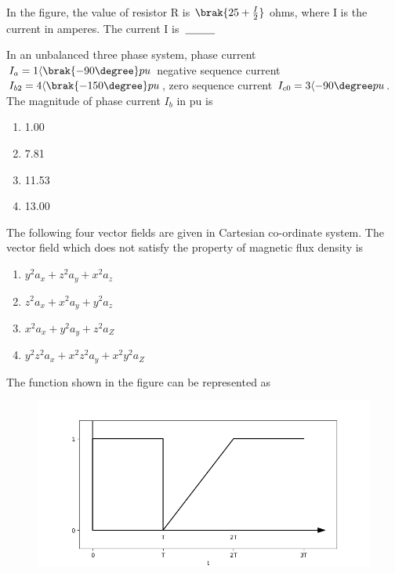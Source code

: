 \item In the figure, the value of resistor R is $\brak{25 + \frac{I}{2}}$ ohms, where I is the current in amperes. The current I is $\makebox[3cm][l]{\underline{\hspace{1cm}}}$ 
\begin{figure}[!ht]
\centering
{}%
\end{figure}
\item In an unbalanced three phase system, phase current $I_{a} = 1{\langle}\brak{-90\degree}pu$ negative sequence current $I_{b2} = 4{\langle}\brak{-150{\degree}}pu$, zero sequence current $I_{c0} = 3\langle{-90\degree}pu$. The magnitude of phase current $I_b$ in pu is
\begin{enumerate}
    \item 1.00
    \item 7.81
    \item 11.53
    \item 13.00
\end{enumerate}
\item The following four vector fields are given in Cartesian co-ordinate system. The vector field which does not satisfy the property of magnetic flux density is
\begin{enumerate}
    \item $y^{2}a_{x} + z^{2}a_{y} + x^2a_{z}$
    \item $z^{2}a_{x} + x^{2}a_{y} + y^{2}a_{z}$
    \item $x^{2}a_{x} + y^{2}a_{y} + z^{2}a_{Z}$
    \item $y^{2}z^{2}a_{x} + x^{2}z^{2}a_{y} + x^{2}y^{2}a_{Z}$
\end{enumerate}
\item The function shown in the figure can be represented as
\begin{figure}[h!]
\centering
\includegraphics[width=0.4\linewidth]{figs/2014-EE/graph.png}
\label{fig:11011}
\end{figure}
